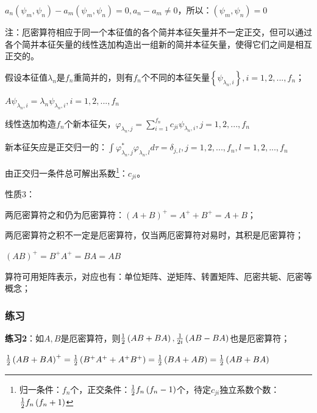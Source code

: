 $a_n \left( {\psi _m ,\psi _n } \right) - a_m \left( {\psi _m ,\psi _n } \right) = 0,a_n  - a_m  \ne 0$，所以：$\left( {\psi _m ,\psi _n } \right) = 0$

注：厄密算符相应于同一个本征值的各个简并本征矢量并不一定正交，但可以通过各个简并本征矢量的线性迭加构造出一组新的简并本征矢量，使得它们之间是相互正交的。

假设本征值$\lambda _n $是$f _n$重简并的，则有$f _n$个不同的本征矢量$\left\{ {\psi _{\lambda _n ,i} } \right\},i = 1,2,...,f_n $；

\begin{center}
$A\psi _{\lambda _n ,i}  = \lambda _n \psi _{\lambda _n ,i} ,i = 1,2,...,f_n $
\end{center}

线性迭加构造$f _n$个新本征矢，$\varphi _{\lambda _n ,j}  = \sum\limits_{i = 1}^{f_n } {c_{ji} \psi _{\lambda _n ,i} } ,j = 1,2,...,f_n $

新本征矢应是正交归一的：$\int {\varphi ^* _{\lambda _n ,j} \varphi _{\lambda _n ,l} d\tau }  = \delta _{j,l} ,j = 1,2,...,f_n ,l = 1,2,...,f_n $

由正交归一条件总可解出系数\footnote{归一条件：$f _n$个，正交条件：${\textstyle{1 \over 2}}f_n \left( {f_n  - 1} \right)$个，待定$c_{ji}$独立系数个数：${\textstyle{1 \over 2}}f_n \left( {f_n  + 1} \right)$}：$c_{ji} $。

性质3：

两厄密算符之和仍为厄密算符：$\left( {A + B} \right)^ +   = A^ +   + B^ +   = A + B$；

两厄密算符之积不一定是厄密算符，仅当两厄密算符对易时，其积是厄密算符；

\begin{center}
$\left( {AB} \right)^ +   = B^ +  A^ +   = BA = AB$
\end{center}


算符可用矩阵表示，对应也有：单位矩阵、逆矩阵、转置矩阵、厄密共轭、厄密等概念；

\subsubsection{练习}

\textbf{练习2}：如$A,B$是厄密算符，则${\textstyle{1 \over 2}}\left(
{AB + BA} \right),{\textstyle{1 \over {2i}}}\left( {AB - BA}
\right)$也是厄密算符；

${\textstyle{1 \over 2}}\left( {AB + BA} \right)^ +   = {\textstyle{1 \over 2}}\left( {B^ +  A^ +   + A^ +  B^ +  } \right) = {\textstyle{1 \over 2}}\left( {BA + AB} \right) = {\textstyle{1 \over 2}}\left( {AB + BA} \right)$

